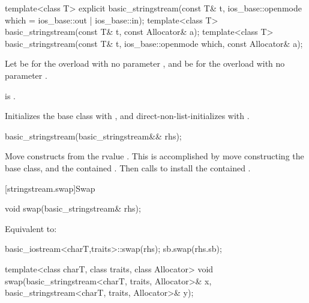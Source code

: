 %
\begin{itemdecl}
template<class T>
  explicit basic_stringstream(const T& t, ios_base::openmode which = ios_base::out | ios_base::in);
template<class T>
  basic_stringstream(const T& t, const Allocator& a);
template<class T>
  basic_stringstream(const T& t, ios_base::openmode which, const Allocator& a);
\end{itemdecl}

\begin{itemdescr}
\pnum
Let  be 
for the overload with no parameter , and
 be  for the overload with no parameter .

\pnum
\constraints
{}
is .

\pnum
\effects
Initializes the base class with , and
direct-non-list-initializes  with .
\end{itemdescr}

%
\begin{itemdecl}
basic_stringstream(basic_stringstream&& rhs);
\end{itemdecl}

\begin{itemdescr}
\pnum
\effects
Move constructs from the rvalue . This
is accomplished by move constructing the base class, and the contained
.
Then calls 
to install the contained .
\end{itemdescr}

[stringstream.swap]{Swap}

%
\begin{itemdecl}
void swap(basic_stringstream& rhs);
\end{itemdecl}

\begin{itemdescr}
\pnum
\effects
Equivalent to:
\begin{codeblock}
basic_iostream<charT,traits>::swap(rhs);
sb.swap(rhs.sb);
\end{codeblock}
\end{itemdescr}

%
\begin{itemdecl}
template<class charT, class traits, class Allocator>
  void swap(basic_stringstream<charT, traits, Allocator>& x,
            basic_stringstream<charT, traits, Allocator>& y);
\end{itemdecl}

